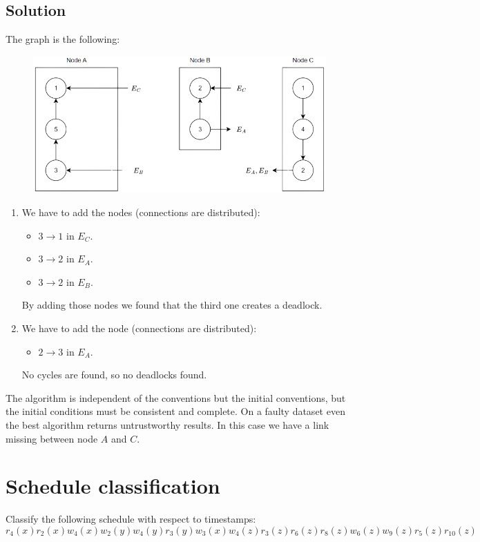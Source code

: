 \documentclass[12pt, a4paper]{report}
\begin{document}
    \subsection*{Solution}
        The graph is the following: 
        \begin{figure}[H]
            \centering
            \includegraphics[width=0.6\linewidth]{images/Ob4.png}
        \end{figure}
        \begin{enumerate}
            \item We have to add the nodes (connections are distributed): 
                \begin{itemize}
                    \item $3 \rightarrow 1$ in $E_C$. 
                    \item $3 \rightarrow 2$ in $E_A$. 
                    \item $3 \rightarrow 2$ in $E_B$. 
                \end{itemize}
                By adding those nodes we found that the third one creates a deadlock. 
            \item We have to add the node (connections are distributed): 
                \begin{itemize}
                    \item $2 \rightarrow 3$ in $E_A$. 
                \end{itemize}
                No cycles are found, so no deadlocks found. 
        \end{enumerate}
        The algorithm is independent of the conventions but the initial conventions, but the initial conditions must be consistent and complete. 
        On a faulty dataset even the best algorithm returns untrustworthy results. In this case we have a link missing between node $A$ and $C$.

    \newpage

    \section{Schedule classification}
        Classify the following schedule with respect to timestamps: 
        \[r_4(x) r_2(x) w_4(x) w_2(y) w_4(y) r_3(y) w_3(x) w_4(z) r_3(z) r_6(z) r_8(z) w_6(z) w_9(z) r_5(z) r_{10}(z)\]
\end{document}
